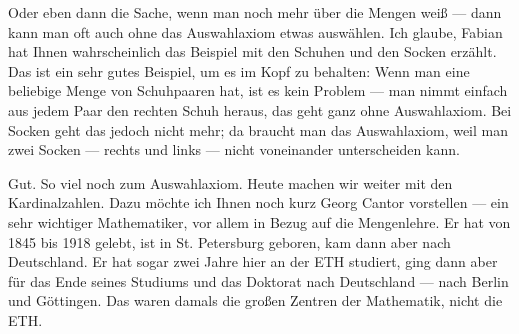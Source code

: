 \begin{spoken-clean}[00:11:50 - 00:13:30]
Oder eben dann die Sache, wenn man noch mehr über die Mengen weiß --- dann kann man oft auch ohne das Auswahlaxiom etwas auswählen. Ich glaube, Fabian hat Ihnen wahrscheinlich das Beispiel mit den Schuhen und den Socken erzählt. Das ist ein sehr gutes Beispiel, um es im Kopf zu behalten: Wenn man eine beliebige Menge von Schuhpaaren hat, ist es kein Problem --- man nimmt einfach aus jedem Paar den rechten Schuh heraus, das geht ganz ohne Auswahlaxiom. Bei Socken geht das jedoch nicht mehr; da braucht man das Auswahlaxiom, weil man zwei Socken --- rechts und links --- nicht voneinander unterscheiden kann.

Gut. So viel noch zum Auswahlaxiom. Heute machen wir weiter mit den Kardinalzahlen. Dazu möchte ich Ihnen noch kurz Georg Cantor vorstellen --- ein sehr wichtiger Mathematiker, vor allem in Bezug auf die Mengenlehre. Er hat von 1845 bis 1918 gelebt, ist in St. Petersburg geboren, kam dann aber nach Deutschland. Er hat sogar zwei Jahre hier an der ETH studiert, ging dann aber für das Ende seines Studiums und das Doktorat nach Deutschland --- nach Berlin und Göttingen. Das waren damals die großen Zentren der Mathematik, nicht die ETH.
\end{spoken-clean}

